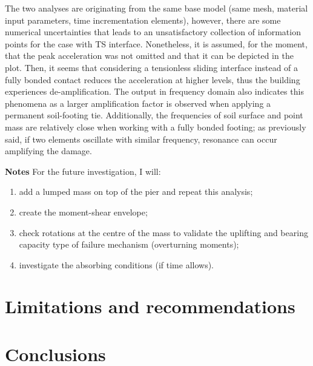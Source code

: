 The two analyses are originating from the same base model (same mesh, material input parameters, time incrementation elements), however, there are some numerical uncertainties that leads to an unsatisfactory collection of information points for the case with TS interface. Nonetheless, it is assumed, for the moment, that the peak acceleration was not omitted and that it can be depicted in the plot. Then, it seems that considering a tensionless sliding interface instead of a fully bonded contact reduces the acceleration at higher levels, thus the building experiences de-amplification. The output in frequency domain also indicates this phenomena as a larger amplification factor is observed when applying a permanent soil-footing tie. Additionally, the frequencies of soil surface and point mass are relatively close when working with a fully bonded footing; as previously said, if two elements oscillate with similar frequency, resonance can occur amplifying the damage. 


\textbf{Notes}
For the future investigation, I will:
\begin{enumerate}
	\item add a lumped mass on top of the pier and repeat this analysis;
	\item create the moment-shear envelope;
	\item check rotations at the centre of the mass to validate the uplifting and bearing capacity type of failure mechanism (overturning moments);
	\item investigate the absorbing conditions (if time allows).
\end{enumerate}
\section{Limitations and recommendations}


\section{Conclusions}

